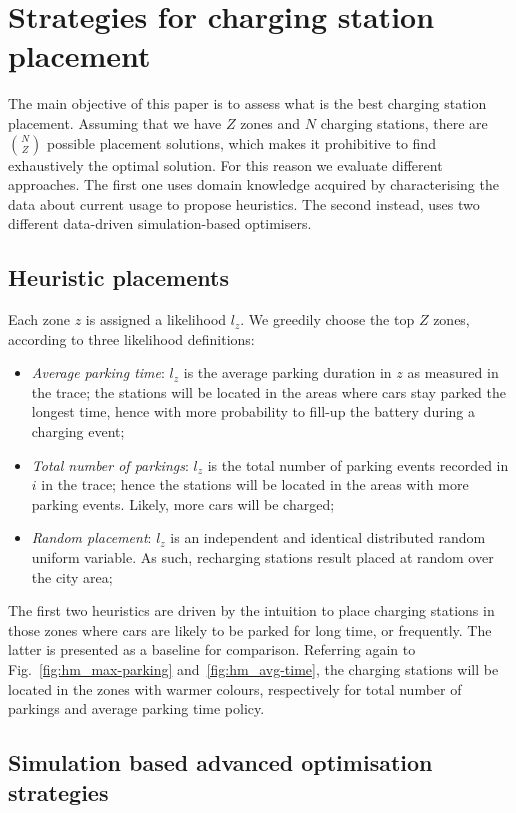\section{Strategies for charging station placement}
\label{sec:7_5_placement}

The main objective of this paper is to assess what is the best charging station placement. Assuming that we have $Z$ zones and $N$ charging stations, there are ${N}\choose{Z}$ possible placement solutions, which makes it prohibitive to find exhaustively the optimal solution. For this reason we evaluate different approaches. The first one uses domain knowledge acquired by characterising the data about current usage to propose heuristics. The second instead, uses two different data-driven simulation-based optimisers.

\subsection{Heuristic placements}

Each zone $z$ is assigned a likelihood $l_z$. We greedily choose the top $Z$ zones, according to three likelihood definitions:
\begin{itemize}
\item{\it Average parking time}: $l_z$ is the average parking duration in $z$ as measured in the trace; the stations will be located in the areas where cars stay parked the longest time, hence with more probability to fill-up the battery during a charging event;
\item{\it Total number of parkings}: $l_z$ is the total number of parking events recorded in $i$ in the trace; hence the stations will be located in the areas with more parking events. Likely, more cars will be charged;
\item{\it Random placement}: $l_z$ is an independent and identical distributed random uniform variable. As such, recharging stations result placed at random over the city area;
\end{itemize}
The first two heuristics are driven by the intuition to place charging stations in those zones where cars are likely to be parked for long time, or frequently. The latter is presented as a baseline for comparison. Referring again to Fig.~\ref{fig:hm_max-parking} and~\ref{fig:hm_avg-time}, the charging stations will be located in the zones with warmer colours, respectively for total number of parkings and average parking time policy.

\subsection{Simulation based advanced optimisation strategies}\label{sec:optmizers}

